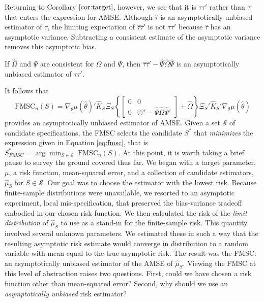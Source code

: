 Returning to Corollary $\ref{cor:target}$, however, we see that it is $\tau \tau'$ rather than $\tau$ that enters the expression for AMSE. 
Although $\widehat{\tau}$ is an asymptotically unbiased estimator of $\tau$, the limiting expectation of $\widehat{\tau} \widehat{\tau}'$ is not $\tau\tau'$ because $\widehat{\tau}$ has an asymptotic variance.  
Subtracting a consistent estimate of the asymptotic variance removes this asymptotic bias.

\begin{cor}
\label{cor:tautau}
If $\widehat{\Omega}$ and $\widehat{\Psi}$ are consistent for $\Omega$ and $\Psi$, then $ \widehat{\tau}\widehat{\tau}' - \widehat{\Psi}\widehat{\Omega}\widehat{\Psi}$ is an asymptotically unbiased estimator of $\tau\tau'$.
\end{cor}
It follows that
\begin{equation}
\label{eq:fmsc}
	\mbox{FMSC}_n(S) = \nabla_\theta\mu(\widehat{\theta})'\widehat{K}_S\Xi_S \left\{\left[\begin{array}{cc}0&0\\0&\widehat{\tau}\widehat{\tau}' - \widehat{\Psi}\widehat{\Omega}\widehat{\Psi}'\end{array}\right] + \widehat{\Omega}\right\}\Xi_S'\widehat{K}_S' \nabla_\theta\mu(\widehat{\theta})
\end{equation}
provides an asymptotically unbiased estimator of AMSE.
Given a set $\mathscr{S}$ of candidate specifications, the FMSC selects the candidate $S^*$ that \emph{minimizes} the expression given in Equation \ref{eq:fmsc}, that is $S^*_{FMSC} =  \arg \min_{S\in \mathscr{S}} \;\mbox{FMSC}_n(S)$.
At this point, it is worth taking a brief pause to survey the ground covered thus far.
We began with a target parameter, $\mu$, a risk function, mean-squared error, and a collection of candidate estimators, $\widehat{\mu}_S$ for $S\in\mathscr{S}$. 
Our goal was to choose the estimator with the lowest risk.
Because finite-sample distributions were unavailable, we resorted to an asymptotic experiment, local mis-specification, that preserved the bias-variance tradeoff embodied in our chosen risk function.
We then calculated the risk of the \emph{limit distribution} of $\widehat{\mu}_S$ to use as a stand-in for the finite-sample risk. 
This quantity involved several unknown parameters.
We estimated these in such a way that the resulting asymptotic risk estimate would converge in distribution to a random variable with mean equal to the true asymptotic risk.
The result was the FMSC: an asymptotically unbiased estimator of the AMSE of $\widehat{\mu}_S$.
Viewing the FMSC at this level of abstraction raises two questions.
First, could we have chosen a risk function other than mean-squared error?
Second, why should we use an \emph{asymptotically unbiased} risk estimator? 

